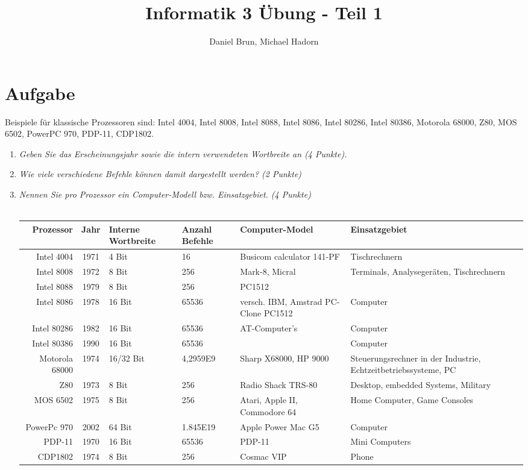 \documentclass[10pt]{article}
\title{Informatik 3 Übung - Teil 1\vspace{-2ex}}
\author{Daniel Brun, Michael Hadorn\vspace{-2ex}}
\begin{document}
\maketitle

\section{Aufgabe}
Beispiele für klassische Prozessoren sind: Intel 4004, Intel 8008, Intel 8088, Intel 8086, Intel 80286, Intel 80386, Motorola 68000, Z80, MOS 6502, PowerPC 970, PDP-11, CDP1802.

\begin{enumerate}[label=\alph*)]
	\item 
	\textit{Geben Sie das Erscheinungsjahr sowie die intern verwendeten Wortbreite an (4 Punkte).}
	\item
	\textit{Wie viele verschiedene Befehle können damit dargestellt werden? (2 Punkte)}\\
	\item
	\textit{Nennen Sie pro Prozessor ein Computer-Modell bzw. Einsatzgebiet. (4 Punkte)}\\\\
	\begin{tabular}{r | c P{1.8cm} P{1.5cm} p{2cm} p{2cm} }
		Prozessor & Jahr & Interne Wortbreite & Anzahl Befehle & Computer-Model & Einsatzgebiet \\
		\hline
		Intel 4004 & 1971 & 4 Bit & 16 & Busicom calculator 141-PF & Tischrechnern \\
		Intel 8008 & 1972 & 8 Bit & 256 & Mark-8, Micral & Terminals, Analysegeräten, Tischrechnern \\
		Intel 8088 & 1979 & 8 Bit & 256  & PC1512 & \\
		Intel 8086 & 1978 & 16 Bit & 65536 & versch. IBM, Amstrad PC-Clone PC1512 & Computer \\
		Intel 80286 & 1982 & 16 Bit & 65536 & AT-Computer's & Computer \\
		Intel 80386 & 1990 & 16 Bit & 65536 &  & Computer \\
		Motorola 68000 & 1974 & 16/32 Bit & 4,2959E9 & Sharp X68000, HP 9000 & Steuerungsrechner in der Industrie, Echtzeitbetriebssysteme, PC \\
		Z80 & 1973 & 8 Bit & 256 & Radio Shack TRS-80 &  Desktop, embedded Systems, Military\\
		MOS 6502 & 1975 & 8 Bit & 256 &  Atari, Apple II, Commodore 64 & Home Computer, Game Consoles\\
		PowerPc 970 & 2002 & 64 Bit & 1.845E19 & Apple Power Mac G5 & Computer \\
		PDP-11 & 1970 & 16 Bit & 65536 & PDP-11 & Mini Computers \\
		CDP1802 & 1974 & 8 Bit & 256 & Cosmac VIP & Phone \\
	\end{tabular}
	
\end{enumerate}
\newpage
\end{document}
